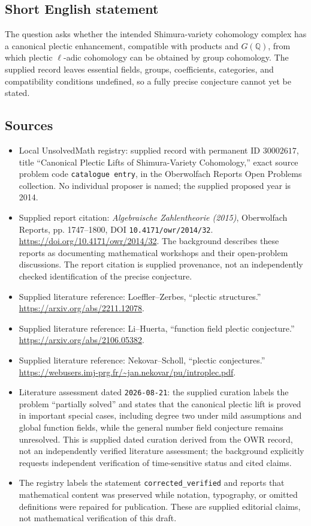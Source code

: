 \documentclass[11pt]{article}
\newcommand{\Q}{\mathbb{Q}}
\begin{document}
\subsection{Short English statement}
The question asks whether the intended Shimura-variety cohomology complex has a canonical plectic enhancement, compatible with products and \(G(\Q)\), from which plectic \(\ell\)-adic cohomology can be obtained by group cohomology. The supplied record leaves essential fields, groups, coefficients, categories, and compatibility conditions undefined, so a fully precise conjecture cannot yet be stated.
\subsection{Sources}
\begin{itemize}
\item Local UnsolvedMath registry: supplied record with permanent ID \(30002617\), title ``Canonical Plectic Lifts of Shimura-Variety Cohomology,'' exact source problem code \texttt{catalogue entry}, in the Oberwolfach Reports Open Problems collection. No individual proposer is named; the supplied proposed year is 2014.
\item Supplied report citation: \emph{Algebraische Zahlentheorie (2015)}, Oberwolfach Reports, pp. 1747--1800, DOI \texttt{10.4171/owr/2014/32}. \url{https://doi.org/10.4171/owr/2014/32}. The background describes these reports as documenting mathematical workshops and their open-problem discussions. The report citation is supplied provenance, not an independently checked identification of the precise conjecture.
\item Supplied literature reference: Loeffler--Zerbes, ``plectic structures.'' \url{https://arxiv.org/abs/2211.12078}.
\item Supplied literature reference: Li--Huerta, ``function field plectic conjecture.'' \url{https://arxiv.org/abs/2106.05382}.
\item Supplied literature reference: Nekovar--Scholl, ``plectic conjectures.'' \url{https://webusers.imj-prg.fr/~jan.nekovar/pu/introplec.pdf}.
\item Literature assessment dated \texttt{2026-08-21}: the supplied curation labels the problem ``partially solved'' and states that the canonical plectic lift is proved in important special cases, including degree two under mild assumptions and global function fields, while the general number field conjecture remains unresolved. This is supplied dated curation derived from the OWR record, not an independently verified literature assessment; the background explicitly requests independent verification of time-sensitive status and cited claims.
\item The registry labels the statement \texttt{corrected\_verified} and reports that mathematical content was preserved while notation, typography, or omitted definitions were repaired for publication. These are supplied editorial claims, not mathematical verification of this draft.
\end{itemize}
\end{document}

